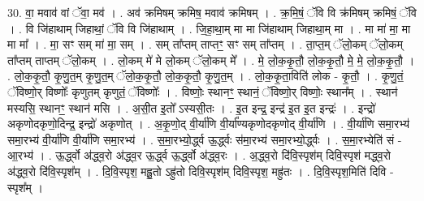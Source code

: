 \documentclass[17pt]{extarticle}
\begin{document}
30. वा॒ मवाव॑ वां ॅवा॒ मव॑ । . अव॑ क्रमिषम् क्रमिष॒ मवाव॑ क्रमिषम् । . क्र॒मि॒षं॒ ॅवि वि क्र॑मिषम् क्रमिषं॒ ॅवि । . वि जि॑हाथाम् जिहाथां॒ ॅवि वि जि॑हाथाम् । . जि॒हा॒था॒म् मा मा जि॑हाथाम् जिहाथा॒म् मा । . मा मा॑ मा॒ मा मा मा᳚ । . मा॒ सꣳ सम् मा॑ मा॒ सम् । . सम् ता᳚प्तम् ताप्तꣳ॒॒ सꣳ सम् ता᳚प्तम् । . ता॒प्त॒म् ॅलो॒कम् ॅलो॒कम् ता᳚प्तम् ताप्तम् ॅलो॒कम् । . लो॒कम् मे॑ मे लो॒कम् ॅलो॒कम् मे᳚ । . मे॒ लो॒क॒कृ॒तौ॒ लो॒क॒कृ॒तौ॒ मे॒ मे॒ लो॒क॒कृ॒तौ॒ । . लो॒क॒कृ॒तौ॒ कृ॒णु॒त॒म् कृ॒णु॒त॒म् ॅलो॒क॒कृ॒तौ॒ लो॒क॒कृ॒तौ॒ कृ॒णु॒त॒म् । . लो॒क॒कृ॒ता॒विति॑ लोक - कृ॒तौ॒ । . कृ॒णु॒तं॒ ॅविष्णो॒र् विष्णोः᳚ कृणुतम् कृणुतं॒ ॅविष्णोः᳚ । . विष्णोः॒ स्थानꣳ॒॒ स्थानं॒ ॅविष्णो॒र् विष्णोः॒ स्थान᳚म् । . स्थान॑ मस्यसि॒ स्थानꣳ॒॒ स्थान॑ मसि । . अ॒सी॒त इ॒तो᳚ ऽस्यसी॒तः । . इ॒त इन्द्र॒ इन्द्र॑ इ॒त इ॒त इन्द्रः॑ । . इन्द्रो॑ अकृणोदकृणो॒दिन्द्र॒ इन्द्रो॑ अकृणोत् । . अ॒कृ॒णो॒द् वी॒र्या॑णि वी॒र्या᳚ण्यकृणोदकृणोद् वी॒र्या॑णि । . वी॒र्या॑णि समा॒रभ्य॑ समा॒रभ्य॑ वी॒र्या॑णि वी॒र्या॑णि समा॒रभ्य॑ । . स॒मा॒रभ्यो॒र्द्ध्व ऊ॒र्द्ध्वः स॑मा॒रभ्य॑ समा॒रभ्यो॒र्द्ध्वः । . स॒मा॒रभ्येति॑ सं - आ॒रभ्य॑ । . ऊ॒र्द्ध्वो अ॑द्ध्व॒रो अ॑द्ध्व॒र ऊ॒र्द्ध्व ऊ॒र्द्ध्वो अ॑द्ध्व॒रः । . अ॒द्ध्व॒रो दि॑वि॒स्पृश॑म् दिवि॒स्पृश॑ मद्ध्व॒रो अ॑द्ध्व॒रो दि॑वि॒स्पृश᳚म् । . दि॒वि॒स्पृश॒ मह्रु॒तो ऽह्रु॑तो दिवि॒स्पृश॑म् दिवि॒स्पृश॒ मह्रु॑तः । . दि॒वि॒स्पृश॒मिति॑ दिवि - स्पृश᳚म् । \newline
\end{document}
